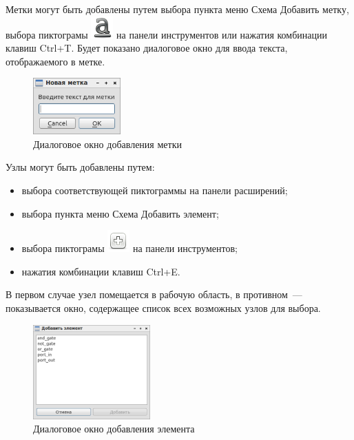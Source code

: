 Метки могут быть добавлены путем выбора пункта меню Схема \rarr Добавить метку, выбора пиктограмы \includegraphics[scale=0.5]{gui/icons/scheme-add-label.png} на панели инструментов или нажатия комбинации клавиш Ctrl+T.
Будет показано диалоговое окно для ввода текста, отображаемого в метке.
\begin{figure}[H]
  \centering
  \includegraphics[width=0.3\textwidth]{gui/add-label.png}
  \caption{Диалоговое окно добавления метки}
\end{figure}

Узлы могут быть добавлены путем:
\begin{itemize}
  \item выбора соответствующей пиктограммы на панели расширений;
  \item выбора пункта меню Схема \rarr Добавить элемент;
  \item выбора пиктограмы \includegraphics[scale=0.5]{gui/icons/scheme-add-node.png} на панели инструментов;
  \item нажатия комбинации клавиш Ctrl+E.
\end{itemize}

В первом случае узел помещается в рабочую область, в противном~--- показывается окно, содержащее список всех возможных узлов для выбора.
\begin{figure}[H]
  \centering
  \includegraphics[width=0.4\textwidth]{gui/add-element.png}
  \caption{Диалоговое окно добавления элемента}
\end{figure}

